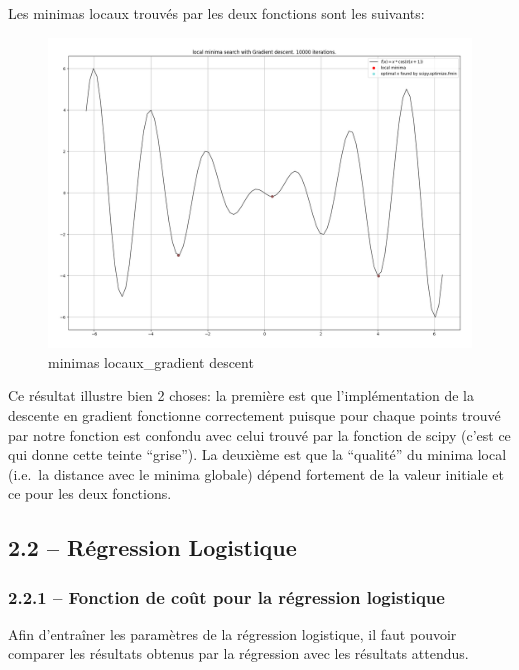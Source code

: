 \documentclass[
]{article}
\begin{document}
Les minimas locaux trouvés par les deux fonctions sont les suivants:

\begin{figure}
\centering
\includegraphics[width=1\textwidth,height=\textheight]{../res/3.1_gradient_descent_minima.png}
\caption{minimas locaux\_gradient descent}
\end{figure}

Ce résultat illustre bien 2 choses: la première est que l'implémentation
de la descente en gradient fonctionne correctement puisque pour chaque
points trouvé par notre fonction est confondu avec celui trouvé par la
fonction de scipy (c'est ce qui donne cette teinte ``grise''). La
deuxième est que la ``qualité'' du minima local (i.e.~la distance avec
le minima globale) dépend fortement de la valeur initiale et ce pour les
deux fonctions.

\newpage{}

\hypertarget{ruxe9gression-logistique-1}{%
\subsection{2.2 -- Régression
Logistique}\label{ruxe9gression-logistique-1}}

\hypertarget{fonction-de-couxfbt-pour-la-ruxe9gression-logistique}{%
\subsubsection{2.2.1 -- Fonction de coût pour la régression
logistique}\label{fonction-de-couxfbt-pour-la-ruxe9gression-logistique}}

Afin d'entraîner les paramètres de la régression logistique, il faut
pouvoir comparer les résultats obtenus par la régression avec les
résultats attendus.
\end{document}
